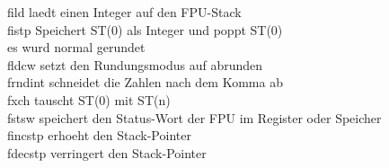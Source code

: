 \documentclass[a4paper,12pt,twoside]{article}
\begin{document}
\begin{tabbing}
  \> fild \> laedt einen Integer auf den FPU-Stack \\ 
  \> fistp \> Speichert ST(0) als Integer und poppt ST(0) \\ 
  \> \> es wurd normal gerundet \\ 
  \> fldcw \> setzt den Rundungsmodus auf abrunden \\ 
  \> frndint \> schneidet die Zahlen nach dem Komma ab \\ 
  \> fxch \> tauscht ST(0) mit ST(n) \\ 
  \> fstsw \> speichert den Status-Wort der FPU im Register oder Speicher \\ 
  \> fincstp \> erhoeht den Stack-Pointer \\ 
  \> fdecstp \> verringert den Stack-Pointer \\ 
\end{tabbing}
\end{document}
